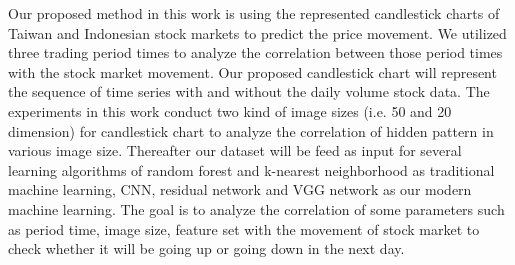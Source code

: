 \documentclass[12pt]{article}
\begin{document}
Our proposed method in this work is using the represented candlestick charts of Taiwan and Indonesian stock markets to predict the price movement. We utilized  three trading period times to analyze the correlation between those period times with the stock market movement. Our proposed candlestick chart will represent the sequence of time series with and without the daily volume stock data. The experiments in this work conduct two kind of image sizes (i.e. 50 and 20 dimension) for candlestick chart to analyze the correlation of hidden pattern in various image size. Thereafter our dataset will be feed as input for several learning algorithms of random forest and k-nearest neighborhood as traditional machine learning, CNN, residual network and VGG network as our modern machine learning. The goal is to analyze the correlation of some parameters such as period time, image size, feature set with the movement of stock market to check whether it will be going up or going down in the next day.
\end{document}
